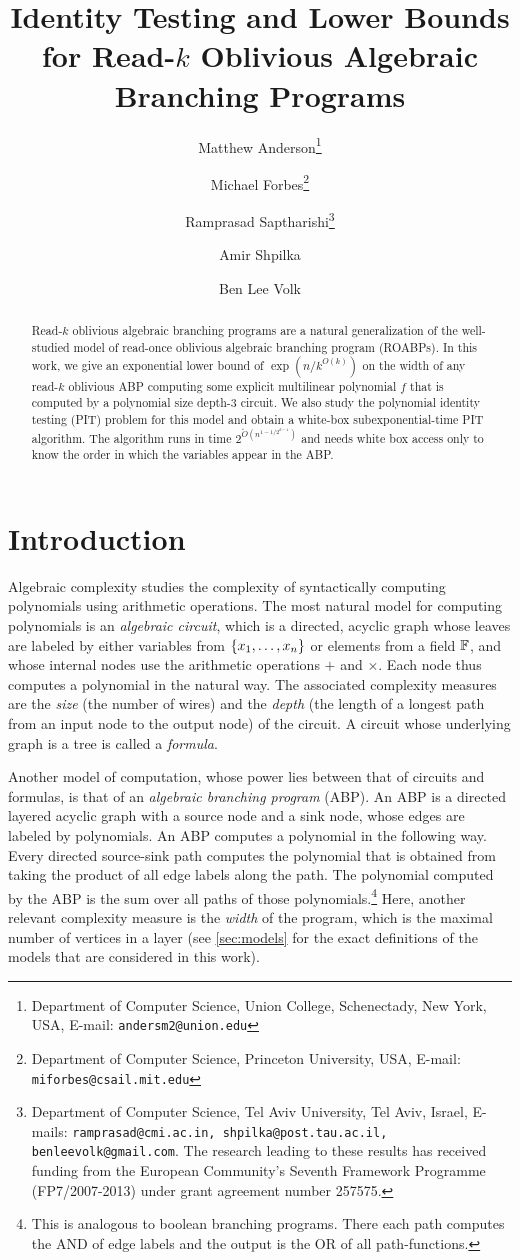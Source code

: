 \documentclass[11pt]{article}
\title{Identity Testing and Lower Bounds for Read-$k$ Oblivious Algebraic Branching Programs%
{\IfFileExists{./sha.tex}{\\\small SHA: }{}}}
\author{
Matthew Anderson\thanks{Department of Computer Science, Union College, Schenectady, New York, USA, E-mail: \texttt{andersm2@union.edu}}%
\and%
Michael Forbes\thanks{Department of Computer Science, Princeton University, USA, E-mail: \texttt{miforbes@csail.mit.edu}}%
\and%
Ramprasad Saptharishi\thanks{Department of Computer Science, Tel Aviv University, Tel Aviv, Israel, E-mails: \texttt{ramprasad@cmi.ac.in, shpilka@post.tau.ac.il, benleevolk@gmail.com}. The research leading to these results has received funding from the European Community's Seventh Framework Programme (FP7/2007-2013) under grant agreement number 257575.}%
\and%
Amir Shpilka\samethanks[3]
\and%
Ben Lee Volk\samethanks[3]
}
\begin{document}
\maketitle

\begin{abstract}
Read-$k$ oblivious algebraic branching programs are a natural generalization of the well-studied model of read-once oblivious algebraic branching program (ROABPs). In this work, we give an exponential lower bound of $\exp(n/k^{O(k)})$ on the width of any read-$k$ oblivious ABP computing some explicit multilinear polynomial $f$ that is computed by a polynomial size depth-$3$ circuit. We also study the polynomial identity testing (PIT) problem for this model and obtain a white-box subexponential-time PIT algorithm. The algorithm runs in time $2^{\tilde{O}(n^{1-1/2^{k-1}})}$ and needs white box access only to know the order in which the variables appear in the ABP.

\end{abstract}

\thispagestyle{empty}
\newpage
{}


\section{Introduction}
\label{sec:intro}

Algebraic complexity studies the complexity of syntactically computing polynomials using arithmetic operations. The most natural model for computing polynomials is an {\em algebraic circuit}, which is a directed, acyclic graph whose leaves are labeled by either variables from $\left\{ x_1, \ldots, x_n \right\}$ or elements from a field $\F$, and whose internal nodes use the arithmetic operations $+$ and $\times$. Each node thus computes a polynomial in the natural way. The associated complexity measures are the {\em size} (the number of wires) and the {\em depth} (the length of a longest path from an input node to the output node) of the circuit. A circuit whose underlying graph is a tree is called a {\em formula}.

Another model of computation, whose power lies between that of circuits and formulas, is that of an {\em algebraic branching program} (ABP). An ABP is a directed layered acyclic graph with a source node and a sink node, whose edges are labeled by polynomials. An ABP  computes a polynomial in the following way. Every directed source-sink path computes the polynomial that is obtained from taking the product of all edge labels along the path. The polynomial computed by the ABP is the sum over all paths of those polynomials.\footnote{This is analogous to boolean branching programs. There each path computes the AND of edge labels and the output is the OR of all path-functions.} Here, another relevant complexity measure is the {\em width} of the program, which is the maximal number of vertices in a layer (see \autoref{sec:models} for the exact definitions of the models that are considered in this work).
\end{document}
